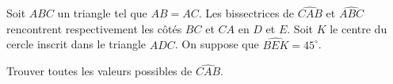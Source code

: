 Soit $ABC$ un triangle tel que $AB = AC$. Les bissectrices de $\widehat{CAB}$ et $\widehat{ABC}$ rencontrent
respectivement les côtés $BC$ et $CA$ en $D$ et $E$. Soit $K$ le centre du cercle inscrit dans le triangle
$ADC$. On suppose que $\widehat{BEK} = 45^\circ$.

Trouver toutes les valeurs possibles de $\widehat{CAB}$.
